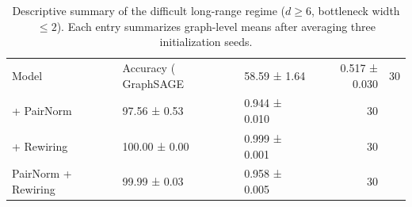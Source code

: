 \begin{table}[htbp]
\caption{Descriptive summary of the difficult long-range regime ($d \geq 6$, bottleneck width $\leq 2$). Each entry summarizes graph-level means after averaging three initialization seeds.}
\label{tab:longrange_hard_regime}
\begin{tabular}{lllr}
\toprule
Model & Accuracy (%
\midrule
GraphSAGE & 58.59 ± 1.64 & 0.517 ± 0.030 & 30 \\
+ PairNorm & 97.56 ± 0.53 & 0.944 ± 0.010 & 30 \\
+ Rewiring & 100.00 ± 0.00 & 0.999 ± 0.001 & 30 \\
PairNorm + Rewiring & 99.99 ± 0.03 & 0.958 ± 0.005 & 30 \\
\bottomrule
\end{tabular}
\end{table}
